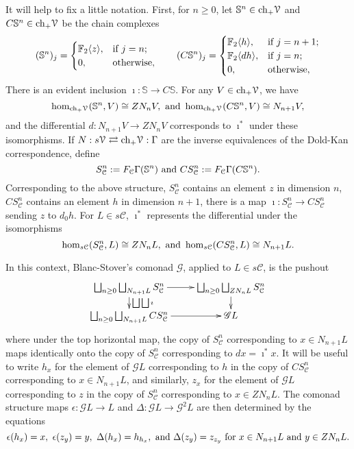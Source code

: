 \documentclass[11pt]{amsart}
\theoremstyle{plain}
\theoremstyle{definition}
\renewcommand{\to}{\longrightarrow}
\newcommand{\scrQ}{\mathscr{Q}}
\newcommand{\scrR}{\mathscr{R}}
\newcommand{\scrT}{\mathscr{T}}
\newcommand{\scrY}{\mathscr{Y}}
\newcommand{\scrI}{\mathscr{I}}
\newcommand{\scrO}{\mathscr{O}}
\newcommand{\scrP}{\mathscr{P}}
\newcommand{\scrS}{\mathscr{S}}
\newcommand{\scrG}{\mathscr{G}}
\newcommand{\scrH}{\mathscr{H}}
\newcommand{\scrJ}{\mathscr{J}}
\newcommand{\scrK}{\mathscr{K}}
\newcommand{\scrL}{\mathscr{L}}
\newcommand{\scrZ}{\mathscr{Z}}
\newcommand{\scrN}{\mathscr{N}}
\newcommand{\scrM}{\mathscr{M}}
\newcommand{\calC}{\mathcal{C}}
\newcommand{\calV}{\mathcal{V}}
\theoremstyle{plain}
\newcommand{\vect}[2]{\calV^{#1}_{#2}}
\newcommand{\BSW}{{\scrG}}%
\newcommand{\F}{\mathbb{F}}
\begin{document}
\begin{Composite functor spectral sequences}
\begin{shaded}\tiny
It will help to fix a little notation. First, for $n\geq0$, let $\mathbb{S}^n\in \textup{ch}_+ \vect{}{}$ and $C\mathbb{S}^n\in \textup{ch}_+ \vect{}{}$ be the chain complexes
\[(\mathbb{S}^n)_j=\begin{cases}
\F_2\langle z\rangle,&\textup{if }j=n;\\
0,&\textup{otherwise},
\end{cases}\qquad 
(C\mathbb{S}^n)_j=\begin{cases}
\F_2\langle h\rangle,&\textup{if }j=n+1;\\
\F_2\langle dh\rangle,&\textup{if }j=n;\\
0,&\textup{otherwise},
\end{cases}
\]
There is an evident inclusion $\imath:\mathbb{S}\to C\mathbb{S}$. For any $V\in\textup{ch}_+\vect{}{}$, we have
\[\hom_{\textup{ch}_+\vect{}{}}(\mathbb{S}^n,V)\cong ZN_nV,\textup{ and }\hom_{\textup{ch}_+\vect{}{}}(C\mathbb{S}^n,V)\cong N_{n+1}V,\]
and the differential $d:N_{n+1}V\to ZN_nV$ corresponds to $\imath^*$ under these isomorphisms. If $N:s\vect{}{}\rightleftarrows \textup{ch}_+ \vect{}{}
:\Gamma$ are the inverse equivalences of the Dold-Kan correspondence, define
\[S^n_{\calC}:=F_{\calC}\Gamma(\mathbb{S}^n)\textup{ and }CS^n_{\calC}:=F_{\calC}\Gamma(C\mathbb{S}^n).\]
Corresponding to the above structure, $S^n_{\calC}$ contains an element $z$ in dimension $n$, $CS^n_{\calC}$ contains an element $h$ in dimension $n+1$, there is a map $\imath:S^n_{\calC}\to CS^n_{\calC}$ sending $z$ to $d_0h$. For $L\in s\calC$, $\imath^*$ represents the differential under the isomorphisms
\[\hom_{s\calC}(S_\calC^n,L)\cong ZN_nL,\textup{ and }\hom_{s\calC}(CS_\calC^n,L)\cong N_{n+1}L.\]
\end{shaded}

In this context, Blanc-Stover's comonad $\BSW$, applied to $L\in s\calC$, is the pushout
\[\xymatrix@R=4mm{
\bigsqcup_{n\geq0}\bigsqcup_{N_{n+1}L}S_\calC^n
\ar[r]\ar[d]^-{\bigsqcup\bigsqcup\imath}
&%
\bigsqcup_{n\geq0}\bigsqcup_{ZN_{n}L}S_\calC^n\ar[d]\\%
\bigsqcup_{n\geq0}\bigsqcup_{N_{n+1}L}CS_\calC^n
\ar[r]&%
\BSW L%
}\]
where under the top horizontal map, the copy of $S^n_\calC$ corresponding to $x\in N_{n+1}L$ maps identically onto the copy of $S^n_\calC$ corresponding to $dx=\imath^*x$. It will be useful to write $h_x$ for the element of $\BSW L$ corresponding to $h$ in the copy of $CS^n_\calC$ corresponding to $x\in N_{n+1}L$, and similarly, $z_x$ for the element of $\BSW L$ corresponding to $z$ in the copy of $S^n_\calC$ corresponding to $x\in ZN_{n}L$. The comonad structure maps $\epsilon:\BSW L\to L$ and $\Delta:\BSW L\to \BSW^2L$ are then determined by the equations
\[\epsilon(h_x)=x,\ \epsilon(z_y)=y,\ \Delta(h_x)=h_{h_x},\textup{ and }\Delta(z_y)=z_{z_y}\textup{ for $x\in N_{n+1}L$ and $y\in ZN_nL$.}\]


\end{Composite functor spectral sequences}
\end{document}
